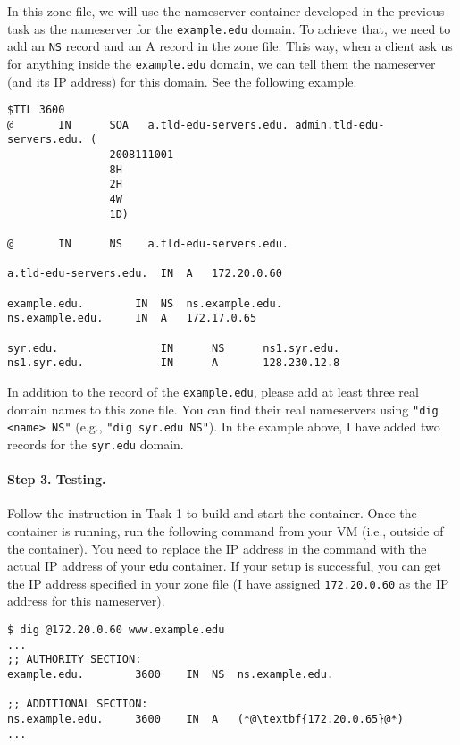 In this zone file, we will use the 
nameserver container developed in the previous task as the nameserver
for the \texttt{example.edu} domain. To achieve that,
we need to add an \texttt{NS} record and an {A} record 
in the zone file. This way, when a client ask us for
anything inside the \texttt{example.edu} domain, we can
tell them the nameserver (and its IP address) for this domain. 
See the following example.


\begin{lstlisting}
$TTL 3600
@       IN      SOA   a.tld-edu-servers.edu. admin.tld-edu-servers.edu. (
                2008111001
                8H
                2H
                4W
                1D)

@       IN      NS    a.tld-edu-servers.edu.

a.tld-edu-servers.edu.	IN 	A	172.20.0.60

example.edu.		IN	NS	ns.example.edu.
ns.example.edu.		IN	A	172.17.0.65

syr.edu.                IN      NS      ns1.syr.edu.
ns1.syr.edu.            IN      A       128.230.12.8
\end{lstlisting}


In addition to the record of the \texttt{example.edu}, please add at least 
three real domain names to this zone file. You can find their real
nameservers using \texttt{"dig <name> NS"} (e.g., \texttt{"dig syr.edu NS"}). 
In the example above, I have added two records for the \texttt{syr.edu} 
domain. 


\paragraph{Step 3. Testing.}
Follow the instruction in Task 1
to build and start the container. Once the container is running,
run the following command from your VM (i.e., outside of the
container). You  need to replace the IP address in the
command with the actual IP address of your 
\texttt{edu} container. If your
setup is successful, you can get the IP address specified
in your zone file (I have assigned \texttt{172.20.0.60} as the 
IP address for this nameserver).

\begin{lstlisting}
$ dig @172.20.0.60 www.example.edu
...
;; AUTHORITY SECTION:
example.edu.		3600	IN	NS	ns.example.edu.

;; ADDITIONAL SECTION:
ns.example.edu.		3600	IN	A	(*@\textbf{172.20.0.65}@*)
...
\end{lstlisting}


